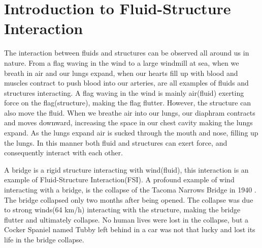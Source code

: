 \chapter{Introduction to Fluid-Structure Interaction}
The interaction between fluids and structures can be observed all around us in nature.
From a flag waving in the wind to a large windmill at sea, when we breath in air and our lungs expand, when our hearts fill up with blood and muscles contract to push blood into our arteries, are all examples of fluids and structures interacting. A flag waving in the wind is mainly air(fluid) exerting force on the flag(structure), making the flag flutter. However, the structure can also move the fluid. 
When we breathe air into our lungs, our diaphram contracts and moves downward, increasing the space in our chest cavity making the lungs expand. As the lungs expand air is sucked through the mouth and nose, filling up the lungs. In this manner both fluid and structures can exert force, and consequently interact with each other. 

A bridge is a rigid structure interacting with wind(fluid), this interaction is an example of Fluid-Structure Interaction(FSI).
A profound example of wind interacting with a bridge, is the collapse of the Tacoma Narrows Bridge in 1940 \cite{Billah1991}. The bridge collapsed only two months after being opened. The collapse was due to strong winds(64 km/h) interacting with the structure, making the bridge flutter and ultimately collapse. No human lives were lost in the collapse, but a Cocker Spaniel named Tubby left behind in a car was not that lucky and lost its life in the bridge collapse. \newline

